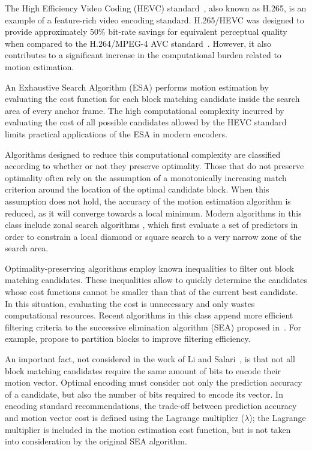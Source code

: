 \documentclass{article}
\begin{document}
The High Efficiency Video Coding (HEVC) standard~\cite{HEVC}, also known as H.265, is an example of a feature-rich video encoding standard. H.265/HEVC was designed to provide approximately 50\% bit-rate savings for equivalent perceptual quality when compared to the H.264/MPEG-4 AVC standard~\cite{H264}. However, it also contributes to a significant increase in the computational burden related to motion estimation. 

An Exhaustive Search Algorithm (ESA) performs motion estimation by evaluating the cost function for each block matching candidate inside the search area of every anchor frame. The high computational complexity incurred by evaluating the cost of all possible candidates allowed by the HEVC standard limits practical applications of the ESA in modern encoders.

Algorithms designed to reduce this computational complexity are classified according to whether or not they preserve optimality. Those that do not preserve optimality often rely on the assumption of a monotonically increasing match criterion around the location of the optimal candidate block. When this assumption does not hold, the accuracy of the motion estimation algorithm is reduced, as it will converge towards a local minimum. Modern algorithms in this class include zonal search algorithms \cite{Tourapis2000, Tourapis2002}, which first evaluate a set of predictors in order to constrain a local diamond or square search to a very narrow zone of the search area.

Optimality-preserving algorithms employ known inequalities to filter out block matching candidates. These inequalities allow to quickly determine the candidates whose cost functions cannot be smaller than that of the current best candidate. In this situation, evaluating the cost is unnecessary and only wastes computational resources. Recent algorithms in this class append more efficient filtering criteria to the successive elimination algorithm (SEA) proposed in~\cite{Li1995}. For example, \cite{Gao2000, Zhu2005a} propose to partition blocks to improve filtering efficiency.

An important fact, not considered in the work of Li and Salari~\cite{Li1995}, is that not all block matching candidates require the same amount of bits to encode their motion vector. Optimal encoding must consider not only the prediction accuracy of a candidate, but also the number of bits required to encode its vector. In encoding standard recommendations, the trade-off between prediction accuracy and motion vector cost is defined using the Lagrange multiplier ($\lambda$); the Lagrange multiplier is included in the motion estimation cost function, but is not taken into consideration by the original SEA algorithm. 
\end{document}
